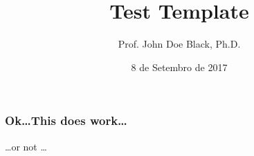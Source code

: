

%
%

%
%
\title{Test Template}
\author{Prof. John Doe Black, Ph.D.}
\date{8 de Setembro de 2017}

%
%


\coverframe

\begin{frame}
    \frametitle{Ok\ldots This does work\ldots}

    \Huge \ldots or not \ldots
\end{frame}



